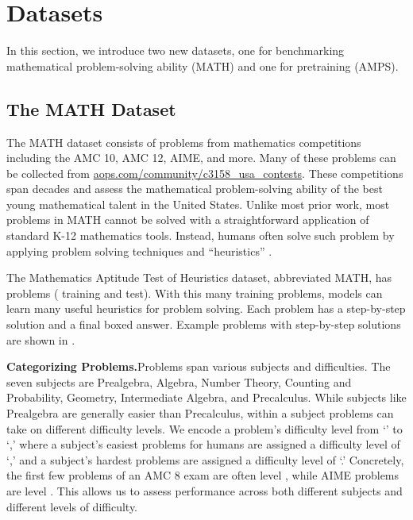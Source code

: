 \documentclass{article}
\begin{document}
\section{Datasets}


In this section, we introduce two new datasets, one for benchmarking mathematical problem-solving ability (MATH) and one for pretraining (AMPS).


\subsection{The MATH Dataset}\label{subsec:math}
The MATH dataset consists of problems from mathematics competitions including the AMC 10, AMC 12, AIME, and more. Many of these problems can be collected from \href{https://artofproblemsolving.com/community/c3158_usa_contests}{aops.com/community/c3158\_usa\_contests}. These competitions span decades and assess the mathematical problem-solving ability of the best young mathematical talent in the United States.
Unlike most prior work, most problems in MATH cannot be solved with a straightforward application of standard K-12 mathematics tools.
Instead, humans often solve such problem by applying problem solving techniques and ``heuristics'' \citep{Polya1945HowTS}.

The Mathematics Aptitude Test of Heuristics dataset, abbreviated MATH, has  problems ( training and  test). With this many training problems, models can learn many useful heuristics for problem solving. Each problem has a step-by-step solution and a final boxed answer. Example problems with step-by-step solutions are shown in .



\textbf{Categorizing Problems.}\quad Problems span various subjects and difficulties. The seven subjects are 
Prealgebra, Algebra, Number Theory, Counting and Probability, Geometry, Intermediate Algebra, and Precalculus. While subjects like Prealgebra are generally easier than Precalculus, within a subject problems can take on different difficulty levels. We encode a problem's difficulty level from `' to `,' where a subject's easiest problems for humans are assigned a difficulty level of `,' and a subject's hardest problems are assigned a difficulty level of `.' Concretely, the first few problems of an AMC 8 exam are often level , while AIME problems are level . 
This allows us to assess performance across both different subjects and different levels of difficulty.
\end{document}

